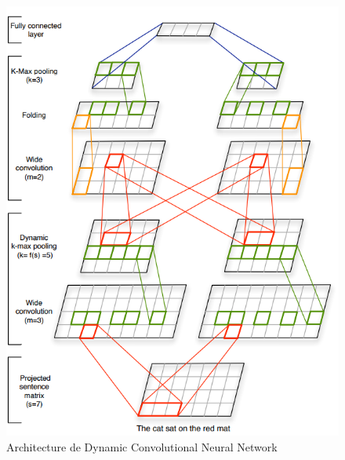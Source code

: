 \begin{figure}
\centering
\includegraphics[scale=0.3]{./tex/natural-language-processing/dcnn.png}
\caption{Architecture de Dynamic Convolutional Neural Network}
\label{dcnn}
\end{figure}

